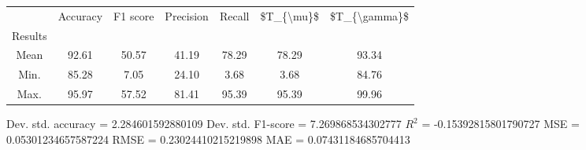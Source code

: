 \begin{tabular}{|c|c|c|c|c|c|c|}
\toprule
{} &  Accuracy &  F1 score &  Precision &  Recall &  \$T\_\{\textbackslash mu\}\$ &  \$T\_\{\textbackslash gamma\}\$ \\
Results &           &           &            &         &            &               \\
\hline
Mean    &     92.61 &     50.57 &      41.19 &   78.29 &      78.29 &         93.34 \\
Min.    &     85.28 &      7.05 &      24.10 &    3.68 &       3.68 &         84.76 \\
Max.    &     95.97 &     57.52 &      81.41 &   95.39 &      95.39 &         99.96 \\
\bottomrule
\end{tabular}

 Dev. std. accuracy = 2.284601592880109
 Dev. std. F1-score = 7.269868534302777
 $R^2$ = -0.15392815801790727
 MSE = 0.05301234657587224
 RMSE = 0.23024410215219898
 MAE = 0.07431184685704413